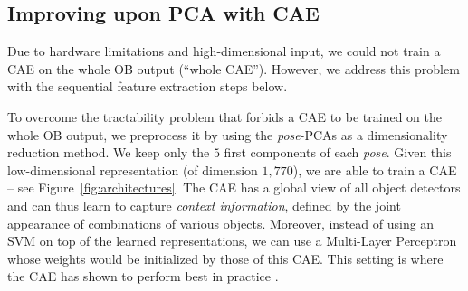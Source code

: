 \documentclass[runningheads,a4paper]{llncs}
\begin{document}
\subsection{Improving upon PCA with CAE}








Due to hardware limitations and high-dimensional input, we could not train a
CAE on the whole OB output (``whole CAE''). However, we address this problem 
with the sequential feature extraction steps below.

\label{sec:highlevel}
To overcome the tractability problem that forbids a CAE to be
trained on the whole OB output, we preprocess it by using the
\textit{pose}-PCAs as a dimensionality reduction method. We keep
only the $5$ first components of each \textit{pose}. Given this
low-dimensional representation (of dimension $1,770$), we are able to
train a CAE -- see Figure~\ref{fig:architectures}.
%
The CAE has a global view of all object detectors and
can thus learn to capture {\em context information}, defined by the
joint appearance of combinations of various objects. Moreover, instead
of using an SVM on top of the learned representations, we can use a
Multi-Layer Perceptron whose weights would be initialized by those of
this CAE. This setting is where the CAE has shown to perform
best in practice \citep{Salah+al-2011}.
\end{document}
